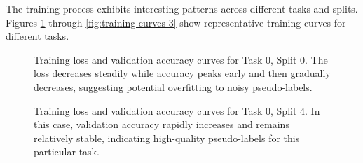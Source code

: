 \documentclass[10pt,conference]{IEEEtran}
\begin{document}
The training process exhibits interesting patterns across different tasks and splits. Figures \ref{fig:training-curves-1} through \ref{fig:training-curves-3} show representative training curves for different tasks.

\begin{figure}[!t]
\centering
{}
\caption{Training loss and validation accuracy curves for Task 0, Split 0. The loss decreases steadily while accuracy peaks early and then gradually decreases, suggesting potential overfitting to noisy pseudo-labels.}
\label{fig:training-curves-1}
\end{figure}

\begin{figure}[!t]
\centering
{}
\caption{Training loss and validation accuracy curves for Task 0, Split 4. In this case, validation accuracy rapidly increases and remains relatively stable, indicating high-quality pseudo-labels for this particular task.}
\label{fig:training-curves-2}
\end{figure}
\end{document}
